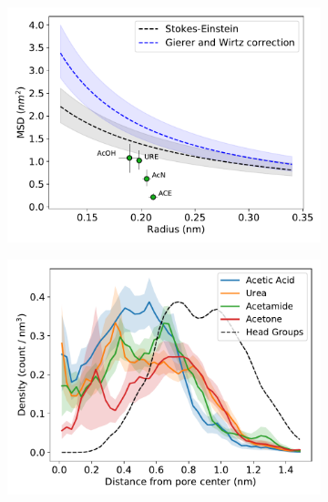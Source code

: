 \documentclass[journal=jpcbfk,manuscript=article]{achemso}
\begin{document}
  \begin{figure}[!htb]
  \centering
  \begin{subfigure}{0.325\textwidth}
  \includegraphics[width=\textwidth]{msd_radius_ketones_10wt.pdf}
  \caption{}\label{fig:ketones_msd}
  \end{subfigure}
  \begin{subfigure}{0.325\textwidth}
  \includegraphics[width=\textwidth]{ketone_rdf.pdf}
  \caption{}\label{fig:ketones_rdf}
  \end{subfigure}
  \begin{subfigure}{0.325\textwidth}

\end{subfigure}
\end{figure}
\end{document}
